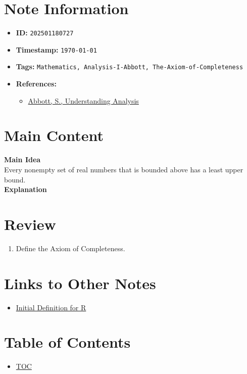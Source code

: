 \clearpage
{}
\label{202501180727}
\renewcommand{\notetitle}{Axiom of Completeness}

\section*{Note Information}
\begin{itemize}
  \item \textbf{ID:} \texttt{202501180727}
  \item \textbf{Timestamp:} \texttt{\today \ \currenttime}
  \item \textbf{Tags:} \texttt{Mathematics, Analysis-I-Abbott, The-Axiom-of-Completeness}
  \item \textbf{References:}
    \begin{itemize}
      \item \href{/home/garrett/Personal/References/Mathematics/Analysis-I/Abbott.pdf}{Abbott, S., Understanding Analysis}
    \end{itemize}
\end{itemize}


\section*{Main Content}
\textbf{Main Idea}\\
Every nonempty set of real numbers that is bounded above has a least upper bound.\\

\textbf{Explanation}\\


\section*{Review}
\begin{enumerate}
  \item Define the Axiom of Completeness.
\end{enumerate}


\section*{Links to Other Notes}
\begin{itemize}
  \item \hyperref[202501180703]{Initial Definition for R}
\end{itemize}

\section*{Table of Contents}

\begin{itemize}
  \item \hyperref[toc]{TOC}
\end{itemize}

